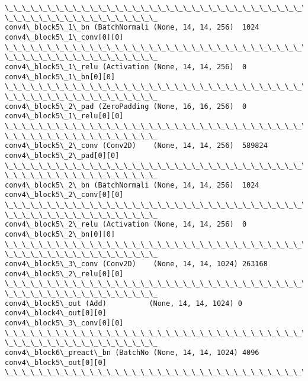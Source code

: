 \documentclass[11pt]{article}
\begin{document}
\begin{Verbatim}[commandchars=\\\{\}]
\_\_\_\_\_\_\_\_\_\_\_\_\_\_\_\_\_\_\_\_\_\_\_\_\_\_\_\_\_\_\_\_\_\_\_\_\_\_\_\_\_\_\_\_\_\_\_\_\_\_\_\_\_\_\_\_\_\_\_\_\_\_\_\_\_\_\_\_\_\_\_\_\_\_\_\_\_\_\_\_
\_\_\_\_\_\_\_\_\_\_\_\_\_\_\_\_\_\_
conv4\_block5\_1\_bn (BatchNormali (None, 14, 14, 256)  1024
conv4\_block5\_1\_conv[0][0]
\_\_\_\_\_\_\_\_\_\_\_\_\_\_\_\_\_\_\_\_\_\_\_\_\_\_\_\_\_\_\_\_\_\_\_\_\_\_\_\_\_\_\_\_\_\_\_\_\_\_\_\_\_\_\_\_\_\_\_\_\_\_\_\_\_\_\_\_\_\_\_\_\_\_\_\_\_\_\_\_
\_\_\_\_\_\_\_\_\_\_\_\_\_\_\_\_\_\_
conv4\_block5\_1\_relu (Activation (None, 14, 14, 256)  0
conv4\_block5\_1\_bn[0][0]
\_\_\_\_\_\_\_\_\_\_\_\_\_\_\_\_\_\_\_\_\_\_\_\_\_\_\_\_\_\_\_\_\_\_\_\_\_\_\_\_\_\_\_\_\_\_\_\_\_\_\_\_\_\_\_\_\_\_\_\_\_\_\_\_\_\_\_\_\_\_\_\_\_\_\_\_\_\_\_\_
\_\_\_\_\_\_\_\_\_\_\_\_\_\_\_\_\_\_
conv4\_block5\_2\_pad (ZeroPadding (None, 16, 16, 256)  0
conv4\_block5\_1\_relu[0][0]
\_\_\_\_\_\_\_\_\_\_\_\_\_\_\_\_\_\_\_\_\_\_\_\_\_\_\_\_\_\_\_\_\_\_\_\_\_\_\_\_\_\_\_\_\_\_\_\_\_\_\_\_\_\_\_\_\_\_\_\_\_\_\_\_\_\_\_\_\_\_\_\_\_\_\_\_\_\_\_\_
\_\_\_\_\_\_\_\_\_\_\_\_\_\_\_\_\_\_
conv4\_block5\_2\_conv (Conv2D)    (None, 14, 14, 256)  589824
conv4\_block5\_2\_pad[0][0]
\_\_\_\_\_\_\_\_\_\_\_\_\_\_\_\_\_\_\_\_\_\_\_\_\_\_\_\_\_\_\_\_\_\_\_\_\_\_\_\_\_\_\_\_\_\_\_\_\_\_\_\_\_\_\_\_\_\_\_\_\_\_\_\_\_\_\_\_\_\_\_\_\_\_\_\_\_\_\_\_
\_\_\_\_\_\_\_\_\_\_\_\_\_\_\_\_\_\_
conv4\_block5\_2\_bn (BatchNormali (None, 14, 14, 256)  1024
conv4\_block5\_2\_conv[0][0]
\_\_\_\_\_\_\_\_\_\_\_\_\_\_\_\_\_\_\_\_\_\_\_\_\_\_\_\_\_\_\_\_\_\_\_\_\_\_\_\_\_\_\_\_\_\_\_\_\_\_\_\_\_\_\_\_\_\_\_\_\_\_\_\_\_\_\_\_\_\_\_\_\_\_\_\_\_\_\_\_
\_\_\_\_\_\_\_\_\_\_\_\_\_\_\_\_\_\_
conv4\_block5\_2\_relu (Activation (None, 14, 14, 256)  0
conv4\_block5\_2\_bn[0][0]
\_\_\_\_\_\_\_\_\_\_\_\_\_\_\_\_\_\_\_\_\_\_\_\_\_\_\_\_\_\_\_\_\_\_\_\_\_\_\_\_\_\_\_\_\_\_\_\_\_\_\_\_\_\_\_\_\_\_\_\_\_\_\_\_\_\_\_\_\_\_\_\_\_\_\_\_\_\_\_\_
\_\_\_\_\_\_\_\_\_\_\_\_\_\_\_\_\_\_
conv4\_block5\_3\_conv (Conv2D)    (None, 14, 14, 1024) 263168
conv4\_block5\_2\_relu[0][0]
\_\_\_\_\_\_\_\_\_\_\_\_\_\_\_\_\_\_\_\_\_\_\_\_\_\_\_\_\_\_\_\_\_\_\_\_\_\_\_\_\_\_\_\_\_\_\_\_\_\_\_\_\_\_\_\_\_\_\_\_\_\_\_\_\_\_\_\_\_\_\_\_\_\_\_\_\_\_\_\_
\_\_\_\_\_\_\_\_\_\_\_\_\_\_\_\_\_\_
conv4\_block5\_out (Add)          (None, 14, 14, 1024) 0
conv4\_block4\_out[0][0]
conv4\_block5\_3\_conv[0][0]
\_\_\_\_\_\_\_\_\_\_\_\_\_\_\_\_\_\_\_\_\_\_\_\_\_\_\_\_\_\_\_\_\_\_\_\_\_\_\_\_\_\_\_\_\_\_\_\_\_\_\_\_\_\_\_\_\_\_\_\_\_\_\_\_\_\_\_\_\_\_\_\_\_\_\_\_\_\_\_\_
\_\_\_\_\_\_\_\_\_\_\_\_\_\_\_\_\_\_
conv4\_block6\_preact\_bn (BatchNo (None, 14, 14, 1024) 4096
conv4\_block5\_out[0][0]
\_\_\_\_\_\_\_\_\_\_\_\_\_\_\_\_\_\_\_\_\_\_\_\_\_\_\_\_\_\_\_\_\_\_\_\_\_\_\_\_\_\_\_\_\_\_\_\_\_\_\_\_\_\_\_\_\_\_\_\_\_\_\_\_\_\_\_\_\_\_\_\_\_\_\_\_\_\_\_\_

\end{Verbatim}
\end{document}

